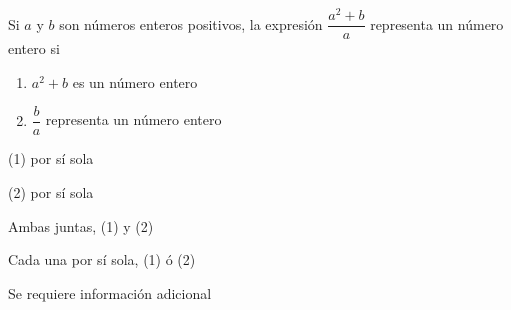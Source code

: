 \documentclass{caes}
\begin{document}
\newpage
\pregunta Si $a$ y $b$ son números enteros positivos, la expresión
$\dfrac{a^2 + b}{a}$ representa un número entero si
\begin{enumerate}[label=(\arabic*), leftmargin=3cm]
    \item $a^2 + b$ es un número entero
    \item $\dfrac{b}{a}$ representa un número entero
\end{enumerate}
\begin{alternativas}
    \item (1) por sí sola
    \item (2) por sí sola
    \item Ambas juntas, (1) y (2)
    \item Cada una por sí sola, (1) ó (2)
    \item Se requiere información adicional
\end{alternativas}
\end{document}
